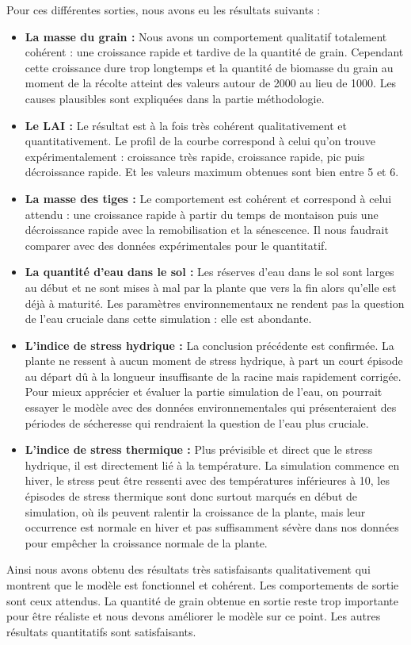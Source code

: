Pour ces différentes sorties, nous avons eu les résultats suivants :

\begin{itemize}
	\item \textbf{La masse du grain :} Nous avons un comportement qualitatif totalement cohérent : une croissance rapide et tardive de la quantité de grain. Cependant cette croissance dure trop longtemps et la quantité de biomasse du grain au moment de la récolte atteint des valeurs autour de 2000 au lieu de 1000. Les causes plausibles sont expliquées dans la partie méthodologie.
	
	\item \textbf{Le LAI :} Le résultat est à la fois très cohérent qualitativement et quantitativement. Le profil de la courbe correspond à celui qu'on trouve expérimentalement : croissance très rapide, croissance rapide, pic puis décroissance rapide. Et les valeurs maximum obtenues sont bien entre 5 et 6.
	
	\item \textbf{La masse des tiges :} Le comportement est cohérent et correspond à celui attendu : une croissance rapide à partir du temps de montaison puis une décroissance rapide avec la remobilisation et la sénescence. Il nous faudrait comparer avec des données expérimentales pour le quantitatif.
	
	\item \textbf{La quantité d'eau dans le sol :} Les réserves d'eau dans le sol sont larges au début et ne sont mises à mal par la plante que vers la fin alors qu'elle est déjà à maturité. Les paramètres environnementaux ne rendent pas la question de l'eau cruciale dans cette simulation : elle est abondante.
	
	\item \textbf{L'indice de stress hydrique :} La conclusion précédente est confirmée. La plante ne ressent à aucun moment de stress hydrique, à part un court épisode au départ dû à la longueur insuffisante de la racine mais rapidement corrigée. Pour mieux apprécier et évaluer la partie simulation de l'eau, on pourrait essayer le modèle avec des données environnementales qui présenteraient des périodes de sécheresse qui rendraient la question de l'eau plus cruciale.
	
	\item \textbf{L'indice de stress thermique :} Plus prévisible et direct que le stress hydrique, il est directement lié à la température. La simulation commence en hiver, le stress peut être ressenti avec des températures inférieures à 10, les épisodes de stress thermique sont donc surtout marqués en début de simulation, où ils peuvent ralentir la croissance de la plante, mais leur occurrence est normale en hiver et pas suffisamment sévère dans nos données pour empêcher la croissance normale de la plante.
\end{itemize}

Ainsi nous avons obtenu des résultats très satisfaisants qualitativement qui montrent que le modèle est fonctionnel et cohérent. Les comportements de sortie sont ceux attendus. La quantité de grain obtenue en sortie reste trop importante pour être réaliste et nous devons améliorer le modèle sur ce point. Les autres résultats quantitatifs sont satisfaisants.
